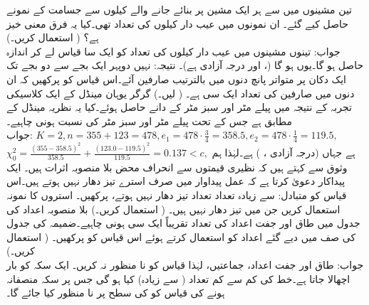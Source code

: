 \quad
تین مشینوں میں سے ہر ایک مشین  پر بنائے جانے والے کیلوں سے  جسامت کے نمونے  حاصل کیے گئے۔ ان نمونوں میں عیب دار کیلوں کی تعداد  تھی۔کیا یہ فرق معنی خیز ہے؟ ( استعمال کریں۔)\\
جواب:\quad
تینوں مشینوں میں عیب دار کیلوں کی تعداد  کو ایک سا قیاس  لے کر  اندازہ حاصل ہو گا۔یوں  ہو گا (، اور درجہ آزادی  ہے)۔ نتیجہ: نہیں
\quad
دوپہر ایک بجے سے دو بجے تک ایک دکان پر متواتر پانچ دنوں میں بالترتیب  صارفین آئے۔اس قیاس کو پرکھیں کہ ان دنوں میں صارفین کی تعداد ایک سی  ہے۔ ( لیں۔) 
\quad
گرگر یوہان مینڈل کے ایک کلاسیکی تجربہ کے نتیجہ میں  پیلے مٹر اور  سبز مٹر کے دانے حاصل ہوئے۔کیا یہ نظریہ مینڈل کے مطابق ہے جس کے تحت   پیلے مٹر اور سبز مٹر   کی  نسبت  ہونی چاہیے۔\\
جواب:\quad
$K=2,n=355+123=478,e_1=478\cdot \tfrac{3}{4}=358.5,e_2=478\cdot\tfrac{1}{4}=119.5,$\\
$\chi^2_0=\tfrac{(355-358.5)^2}{358.5}+\tfrac{(123.0-119.5)^2}{119.5}=0.137<c,$
ہے جہاں  (درجہ آزادی ، ) ہے۔لہٰذا ہم  وثوق سے کہتے ہیں کہ نظیری قیمتوں سے انحراف محض بلا منصوبہ اثرات ہیں۔
\quad
ایک پیداکار دعویٰ کرتا ہے کہ عمل پیداوار میں صرف  استرے  تیز دھار نہیں ہوتے ہیں۔اس قیاس کو متبادل:  سے زیادہ تعداد تعداد تیز دھار نہیں ہوتے، پرکھیں۔  استروں کا نمونہ استعمال کریں جن میں  تیز دھار نہیں ہیں۔ ( استعمال کریں۔)
\quad
بلا منصوبہ اعداد کی جدول میں طاق اور جفت اعداد کی تعداد تقریباً ایک سی  ہونی چاہیے۔ضمیمہ  کی جدول  کی  صف   میں دیے گئے  اعداد کو استعمال کرتے ہوئے اس قیاس کو پرکھیں۔ ( استعمال کریں۔) \\
جواب:\quad
{} طاق  اور  جفت اعداد،  جماعتیں،  لہٰذا قیاس کو نا منظور نہ کریں۔
\quad
ایک سکہ کو  بار اچھالا جاتا ہے۔خط کی کم سے کم تعداد ( سے زیادہ) کیا ہو گی جس پر سکہ منصفانہ ہونے  کی قیاس کو  کی سطح پر نا منظور کیا جائے گا۔
